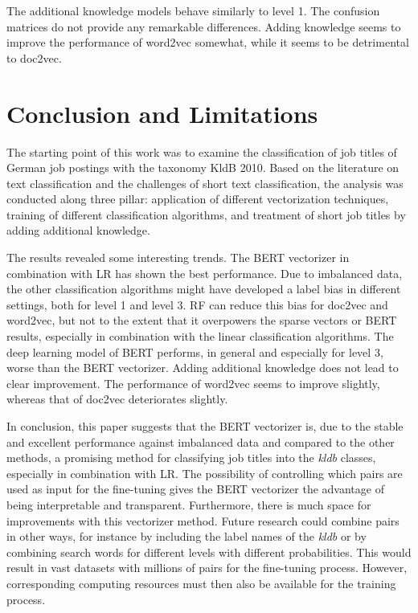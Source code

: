 \documentclass[12pt, a4paper, titlepage]{article}
\begin{document}
The additional knowledge models behave similarly to level 1. The confusion matrices do not provide any remarkable differences. Adding knowledge seems to improve the performance of word2vec somewhat, while it seems to be detrimental to doc2vec.


\section{Conclusion and Limitations}
The starting point of this work was to examine the classification of job titles of German job postings with the taxonomy \ac{KldB} 2010. Based on the literature on text classification and the challenges of short text classification, the analysis was conducted along three pillar: application of different vectorization techniques, training of different classification algorithms, and treatment of short job titles by adding additional knowledge. 

The results revealed some interesting trends. The \ac{BERT} vectorizer in combination with \ac{LR} has shown the best performance. Due to imbalanced data, the other classification algorithms might have developed a label bias in different settings, both for level 1 and level 3. \ac{RF} can reduce this bias for doc2vec and word2vec, but not to the extent that it overpowers the sparse vectors or BERT results, especially in combination with the linear classification algorithms. The deep learning model of \ac{BERT} performs, in general and especially for level 3, worse than the \ac{BERT} vectorizer. Adding additional knowledge does not lead to clear improvement. The performance of word2vec seems to improve slightly, whereas that of doc2vec deteriorates slightly. 

In conclusion, this paper suggests that the \ac{BERT} vectorizer is, due to the stable and excellent performance against imbalanced data and compared to the other methods, a promising method for classifying job titles into the \textit{kldb} classes, especially in combination with \ac{LR}. The possibility of controlling which pairs are used as input for the fine-tuning gives the \ac{BERT} vectorizer the advantage of being interpretable and transparent. Furthermore, there is much space for improvements with this vectorizer method. Future research could combine pairs in other ways, for instance by including the label names of the \textit{kldb} or by combining search words for different levels with different probabilities. This would result in vast datasets with millions of pairs for the fine-tuning process. However, corresponding computing resources must then also be available for the training process. 
\end{document}
